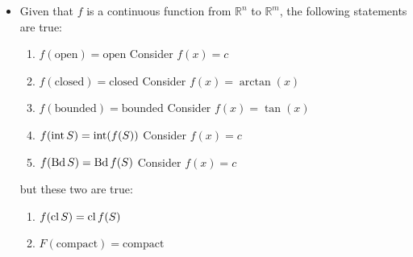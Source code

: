 \begin{itemize}
          \newpage
    \item Given that $f$ is a continuous function from $\mathbb{R}^n$ to $\mathbb{R}^m$, the following statements are true:
          \begin{enumerate}
              \item $f(\text{open})=\text{open}$ {\color{red} Consider $f(x)=c$}
              \item $f(\text{closed})=\text{closed}$ {\color{red} Consider $f(x)=\arctan(x)$}
              \item $f(\text{bounded})=\text{bounded}$  {\color{red} Consider $f(x)=\tan(x)$}
              \item $f(\operatorname{int} S)=\operatorname{int}(f(S))$  {\color{red} Consider $f(x)=c$}
              \item $f(\operatorname{Bd} S)=\operatorname{Bd} f(S)$  {\color{red} Consider $f(x)=c$}
          \end{enumerate}
          but these two are true:
          \begin{enumerate}
              \item $f(\operatorname{cl} S)=\operatorname{cl} f(S)$
              \item $F(\text{compact})=\text{compact}$
          \end{enumerate}
\end{itemize}